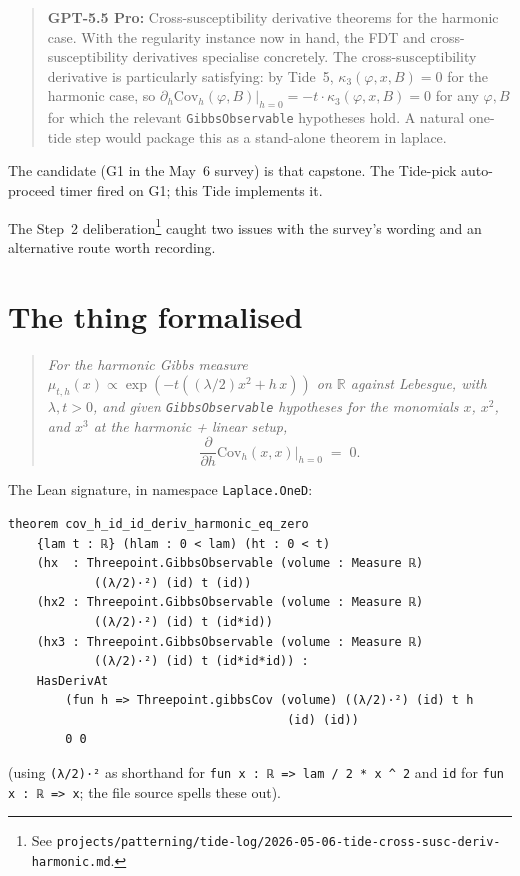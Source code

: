 \documentclass[11pt]{article}
\newcommand{\gptbox}[1]{\par\medskip\begin{quote}\small\textbf{\textcolor{green!50!black}{GPT-5.5 Pro:}} #1\end{quote}\medskip}
\begin{document}
\gptbox{Cross-susceptibility derivative theorems for the harmonic case.
With the regularity instance now in hand, the FDT and cross-susceptibility
derivatives specialise concretely. The cross-susceptibility derivative is
particularly satisfying: by Tide~5,
$\kappa_3(\varphi, x, B) = 0$ for the harmonic case, so
$\partial_h \mathrm{Cov}_h(\varphi, B)|_{h=0} = -t \cdot \kappa_3(\varphi, x, B) = 0$
for any $\varphi, B$ for which the relevant \texttt{GibbsObservable}
hypotheses hold. A natural one-tide step would package this as a stand-alone
theorem in laplace.}

The candidate (G1 in the May~6 survey) is that capstone. The Tide-pick
auto-proceed timer fired on G1; this Tide implements it.

The Step~2 deliberation\footnote{See \texttt{projects/patterning/tide-log/2026-05-06-tide-cross-susc-deriv-harmonic.md}.}
caught two issues with the survey's wording and an alternative route
worth recording.

\section{The thing formalised}

\begin{quote}\itshape
For the harmonic Gibbs measure
$\mu_{t,h}(x) \propto \exp(-t((\lambda/2)x^2 + h\,x))$ on $\mathbb{R}$
against Lebesgue, with $\lambda, t > 0$, and given
\texttt{GibbsObservable} hypotheses for the monomials $x$, $x^2$, and
$x^3$ at the harmonic + linear setup,
\[
  \frac{\partial}{\partial h} \mathrm{Cov}_h(x, x)\bigg|_{h=0} \;=\; 0.
\]
\end{quote}

\noindent The Lean signature, in namespace \texttt{Laplace.OneD}:
\begin{verbatim}
theorem cov_h_id_id_deriv_harmonic_eq_zero
    {lam t : ℝ} (hlam : 0 < lam) (ht : 0 < t)
    (hx  : Threepoint.GibbsObservable (volume : Measure ℝ)
            ((λ/2)·²) (id) t (id))
    (hx2 : Threepoint.GibbsObservable (volume : Measure ℝ)
            ((λ/2)·²) (id) t (id*id))
    (hx3 : Threepoint.GibbsObservable (volume : Measure ℝ)
            ((λ/2)·²) (id) t (id*id*id)) :
    HasDerivAt
        (fun h => Threepoint.gibbsCov (volume) ((λ/2)·²) (id) t h
                                       (id) (id))
        0 0
\end{verbatim}

\noindent (using \texttt{(λ/2)·²} as shorthand for \texttt{fun x : ℝ
=> lam / 2 * x ^ 2} and \texttt{id} for \texttt{fun x : ℝ => x}; the
file source spells these out).
\end{document}
